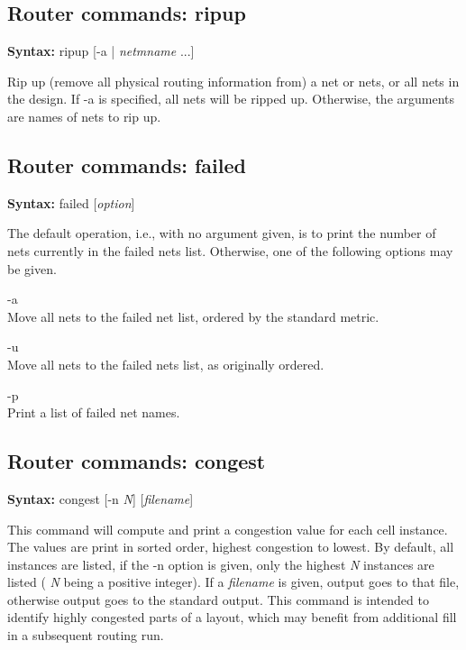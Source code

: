 \subsection{Router commands: {\vt ripup}}

{\bf Syntax:} {\vt ripup} [{\vt -a} {\vt |} {\it netmname} ...]

Rip up (remove all physical routing information from) a net or nets,
or all nets in the design.  If {\vt -a} is specified, all nets
will be ripped up.  Otherwise, the arguments are names of nets to
rip up.

\subsection{Router commands: {\vt failed}}

{\bf Syntax:} {\vt failed} [{\it option\/}]

The default operation, i.e., with no argument given, is to print the
number of nets currently in the failed nets list.  Otherwise, one of
the following options may be given.
\begin{description}
\item{\vt -a}\\
Move all nets to the failed net list, ordered by the standard metric.
\item{\vt -u}\\
Move all nets to the failed nets list, as originally ordered.
\item{\vt -p}\\
Print a list of failed net names.
\end{description}

\subsection{Router commands: {\vt congest}}

{\bf Syntax:} {\vt congest} [{\vt -n} {\it N\/}] [{\it filename\/}]

This command will compute and print a congestion value for each cell
instance.  The values are print in sorted order, highest congestion
to lowest.  By default, all instances are listed, if the {\vt -n}
option is given, only the highest {\it N} instances are listed ({\it
N} being a positive integer).  If a {\it filename} is given, output
goes to that file, otherwise output goes to the standard output. 
This command is intended to identify highly congested parts of a
layout, which may benefit from additional fill in a subsequent
routing run.


